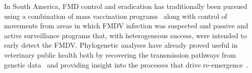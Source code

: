 \documentclass[10pt]{article}
\begin{document}

In South America, FMD control and eradication has traditionally been pursued using a combination of mass vaccination programs~\cite{vaccinationSA} along with control of movements from areas in which FMDV infection was suspected and passive and active surveillance programs that, with heterogeneous success, were intended to early detect the FMDV.
Phylogenetic analyses have already proved useful in veterinary public health both by recovering the transmission pathways from genetic data~\cite{cottam2007,cottam2008} and providing insight into the processes that drive re-emergence~\cite{combining}.
\end{document}
